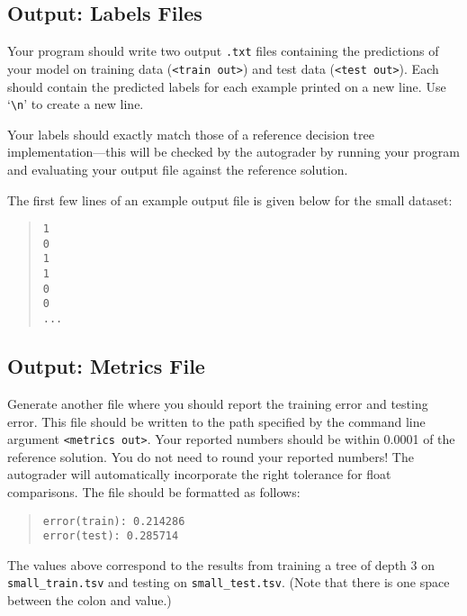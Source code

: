 \subsection{Output: Labels Files}
\label{sec:labels}

Your program should write two output \lstinline{.txt} files containing the predictions of your model on training data (\lstinline{<train out>}) and test data (\lstinline{<test out>}). Each should contain the predicted labels for each example printed on a new line. Use `\texttt{\textbackslash n}' to create a new line.

Your labels should exactly match those of a reference decision tree implementation---this will be checked by the autograder by running your program and evaluating your output file against the reference solution.

%
The first few lines of an example output file is given below for the small dataset:
\begin{quote}
\begin{verbatim}
1
0
1
1
0
0
...
\end{verbatim}
\end{quote}

\subsection{Output: Metrics File}
\label{sec:metrics}

Generate another file where you should report the training error and testing error. This file should be written to the path specified by the command line argument \lstinline{<metrics out>}. Your reported numbers should be within 0.0001 of the reference solution. You do not need to round your reported numbers! The autograder will automatically incorporate the right tolerance for float comparisons. The file should be formatted as follows:

\begin{quote}
\begin{verbatim}
error(train): 0.214286
error(test): 0.285714
\end{verbatim}
\end{quote}

The values above correspond to the results from training a tree of depth 3 on \texttt{small\_train.tsv} and testing on \texttt{small\_test.tsv}. (Note that there is one space between the colon and value.)


